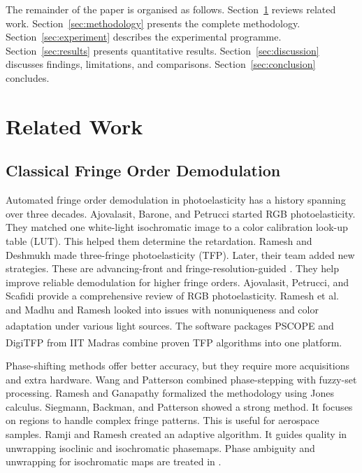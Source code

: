 \documentclass[review,12pt]{elsarticle}
\begin{document}
The remainder of the paper is organised as follows. Section~\ref{sec:related}
reviews related work. Section~\ref{sec:methodology} presents the complete
methodology. Section~\ref{sec:experiment} describes the experimental programme.
Section~\ref{sec:results} presents quantitative results. Section~\ref{sec:discussion}
discusses findings, limitations, and comparisons. Section~\ref{sec:conclusion}
concludes.

\FloatBarrier
\section{Related Work}
\label{sec:related}

\subsection{Classical Fringe Order Demodulation}

Automated fringe order demodulation in photoelasticity has a history spanning over three decades. Ajovalasit, Barone, and Petrucci \cite{ajovalasit1995} started RGB photoelasticity. They matched one white-light isochromatic image to a color calibration look-up table (LUT). This helped them determine the retardation. Ramesh and Deshmukh \cite{ramesh1996} made three-fringe photoelasticity (TFP). Later, their team added new strategies. These are advancing-front \cite{kale2013} and fringe-resolution-guided \cite{ramesh2015}. They help improve reliable demodulation for higher fringe orders. Ajovalasit, Petrucci, and Scafidi \cite{ajovalasit2015} provide a comprehensive review of RGB photoelasticity. Ramesh et al.\ \cite{ramesh2011} and Madhu and Ramesh \cite{madhu2007} looked into issues with nonuniqueness and color adaptation under various light sources. The software packages PSCOPE\textsuperscript{\textregistered} and DigiTFP\textsuperscript{\textregistered} from IIT Madras combine proven TFP algorithms into one platform.

Phase-shifting methods offer better accuracy, but they require more acquisitions and extra hardware. Wang and Patterson \cite{wang1995} combined phase-stepping with fuzzy-set processing. Ramesh and Ganapathy \cite{ramesh1996phaseshifting} formalized the methodology using Jones calculus. Siegmann, Backman, and Patterson \cite{siegmann2005} showed a strong method. It focuses on regions to handle complex fringe patterns. This is useful for aerospace samples. Ramji and Ramesh \cite{ramji2010} created an adaptive algorithm. It guides quality in unwrapping isoclinic and isochromatic phasemaps. Phase ambiguity and unwrapping for isochromatic maps are treated in \cite{ramesh2004,ramji2008}.
\end{document}
